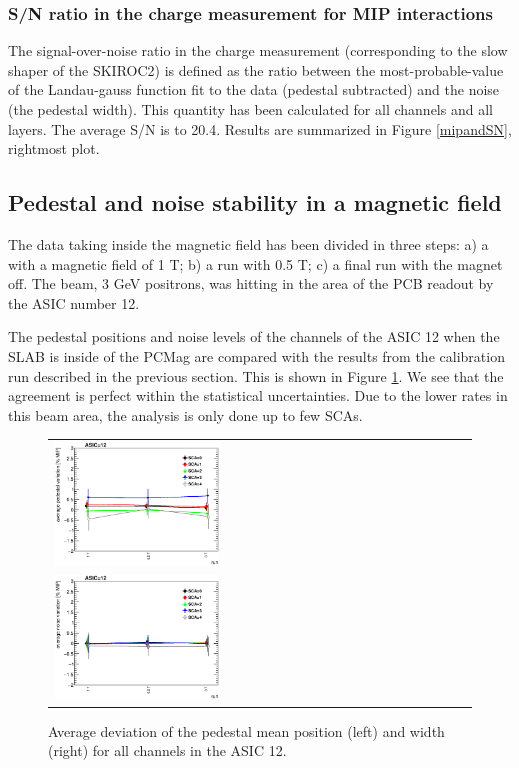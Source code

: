 \documentclass[final,3p,times,twocolumn]{elsarticle}
\begin{document}
\subsubsection{S/N ratio in the charge measurement for MIP interactions}
\label{sec:sn}

The signal-over-noise ratio in the charge measurement (corresponding to the slow shaper of the SKIROC2) is defined 
as the ratio between the most-probable-value of
the Landau-gauss function fit to the data (pedestal subtracted) and the noise (the pedestal width). This quantity 
has been calculated for all channels and all layers. The average S/N is to 20.4.
Results are summarized in Figure \ref{mipandSN}, rightmost plot.

\subsection{Pedestal and noise stability in a magnetic field}
\label{sec:magnetic}

The data taking inside the magnetic field has been divided in three steps:
a) a with a magnetic field of 1 T; b) a run with 0.5 T; c) a final run with the magnet off.
The beam, 3 GeV positrons, was hitting in the area of the PCB readout by the ASIC number 12.

The pedestal positions and noise levels of the channels of the ASIC 12 when the
SLAB is inside of the PCMag are compared with the results from the calibration run described in the previous section.
This is shown in Figure \ref{pedestal_magnetic}.
We see that the agreement is perfect within the statistical uncertainties.
Due to the lower rates in this beam area, the
analysis is only done up to few SCAs.

\begin{figure}[!t]
  \centering
  \begin{tabular}{l}
    \includegraphics[width=0.4\textwidth]{../figs/pedestal/1T/summary_pedestal_chip12.eps} \\
    \includegraphics[width=0.4\textwidth]{../figs/pedestal/1T/summary_noise_chip12.eps}
  \end{tabular}
  \caption{Average deviation of the pedestal mean position (left) and width (right) for all channels in the ASIC 12.}
\label{pedestal_magnetic}
\end{figure}
\end{document}
